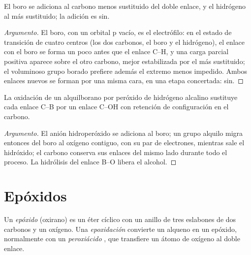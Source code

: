 \begin{proposition}\label{prop:b2:alkene-redox:hydroboration-regio}
El boro se adiciona al carbono menos sustituido del doble enlace, y el hidrógeno al más
sustituido; la adición es sin.
\end{proposition}

\begin{proof}[Argumento]
El boro, con un orbital p vacío, es el electrófilo: en el estado de transición de cuatro centros
(los dos carbonos, el boro y el hidrógeno), el enlace con el boro se forma un poco antes que el enlace C--H, y una
carga parcial positiva aparece sobre el otro carbono, mejor estabilizada por el más
sustituido; el voluminoso grupo borado prefiere además el extremo menos impedido. Ambos enlaces nuevos
se forman por una misma cara, en una etapa concertada: sin.
\end{proof}

\begin{proposition}\label{prop:b2:alkene-redox:retention}
La oxidación de un alquilborano por peróxido de hidrógeno alcalino sustituye cada enlace C--B por un
enlace C--OH con retención de configuración en el carbono.
\end{proposition}

\begin{proof}[Argumento]
El anión hidroperóxido se adiciona al boro; un grupo alquilo migra entonces del boro al
oxígeno contiguo, con su par de electrones, mientras sale el hidróxido; el carbono conserva sus enlaces
del mismo lado durante todo el proceso. La hidrólisis del enlace B--O libera el alcohol.
\end{proof}

\section{Epóxidos}

\begin{definition}[Epóxido]\label{def:b2:alkene-redox:epoxide}
Un \emph{epóxido} (oxirano) es un éter cíclico con un anillo de tres eslabones de
dos carbonos y un oxígeno. Una \emph{epoxidación} convierte un alqueno en
un epóxido, normalmente con un \emph{peroxiácido} , que transfiere
un átomo de oxígeno al doble enlace.
\end{definition}

